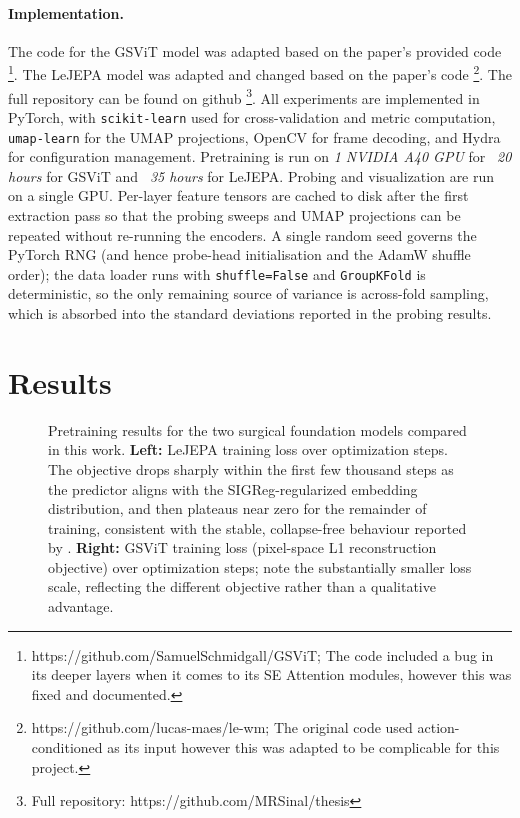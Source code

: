\documentclass[11pt, a4paper]{article}
\begin{document}
\paragraph{Implementation.} The code for the GSViT model was adapted based on the \textcite{schmidgall2024general} paper's provided code \footnote{https://github.com/SamuelSchmidgall/GSViT; The code included a bug in its deeper layers when it comes to its SE Attention modules, however this was fixed and documented.}. The LeJEPA model was adapted and changed based on the \textcite{maes-2026} paper's code \footnote{https://github.com/lucas-maes/le-wm; The original code used action-conditioned as its input however this was adapted to be complicable for this project.}. The full repository can be found on github \footnote{Full repository: https://github.com/MRSinal/thesis}.
All experiments are implemented in PyTorch, with \texttt{scikit-learn}
used for cross-validation and metric computation, \texttt{umap-learn}
for the UMAP projections, OpenCV for frame decoding, and Hydra for
configuration management. Pretraining is run on \textit{1 NVIDIA A40 GPU} for \textit{~20 hours} for GSViT and \textit{~35 hours} for LeJEPA. Probing and visualization are run on a single GPU. Per-layer feature tensors are cached to disk after the first extraction pass so that the probing sweeps and UMAP projections can be repeated without re-running the encoders. A single random seed governs the PyTorch RNG (and hence probe-head initialisation and the AdamW shuffle order); the data loader runs with \texttt{shuffle=False} and \texttt{GroupKFold} is deterministic, so the only remaining source of variance is across-fold sampling, which is absorbed into the standard deviations reported in the probing results.

\section{Results}
\begin{figure}[t!]
\centering
\begin{minipage}{.49\textwidth}
\centering

\end{minipage}\hfill
\begin{minipage}{.49\textwidth}
\centering

\end{minipage}

\caption{Pretraining results for the two surgical foundation
models compared in this work. \textbf{Left: } LeJEPA training loss over
optimization steps. The objective drops sharply within the first few
thousand steps as the predictor aligns with the SIGReg-regularized
embedding distribution, and then plateaus near zero for the
remainder of training, consistent with the stable, collapse-free
behaviour reported by \textcite{balestriero-2025}.
\textbf{Right: } GSViT training loss (pixel-space L1 reconstruction
objective) over optimization steps; note the substantially smaller
loss scale, reflecting the different objective rather than a
qualitative advantage.}
\label{fig:pretrain}
\end{figure}
\end{document}
